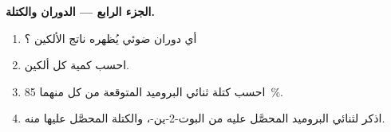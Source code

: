 \begin{problem}
\medskip
\noindent\textbf{الجزء الرابع --- الدوران والكتلة.}
\begin{enumerate}[resume]
  \item أي دوران ضوئي يُظهره ناتج الألكين ؟
  \item احسب كمية كل ألكين.
  \item احسب كتلة ثنائي البروميد المتوقعة من كل منهما 
        \qty{85}{\percent}.
  \item اذكر  لثنائي البروميد المحصَّل عليه من
        البوت-2-ين-، والكتلة المحصَّل عليها منه.
\end{enumerate}
\end{problem}
